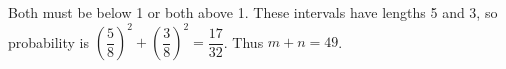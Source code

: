 Both must be below 1 or both above 1. These intervals have lengths 5 and 3, so probability is $(\dfrac{5}{8})^2+(\dfrac{3}{8})^2=\dfrac{17}{32}$. Thus $\boxed{m+n=49}$.
